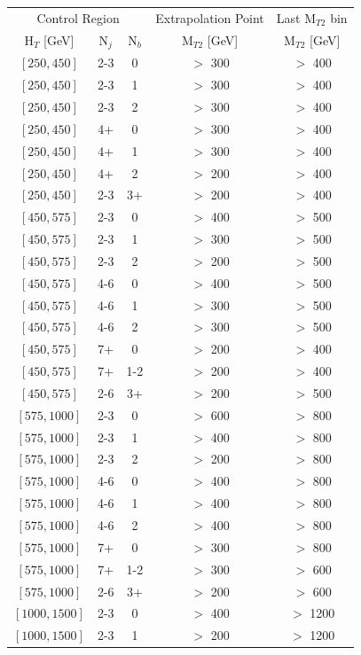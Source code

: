 \begin{table}
	\centering
	\footnotesize
	\renewcommand{\arraystretch}{0.4}
	\begin{tabular}{c|c|c|c|c}
\hline \hline
\multicolumn{3}{c|}{Control Region} & Extrapolation Point & Last $\text{M}_{T2}$ bin  \\
$\text{H}_{T}$ [GeV] & $\text{N}_{j}$ & $\text{N}_{b}$ & $\text{M}_{T2}$ [GeV] & $\text{M}_{T2}$ [GeV]\\
\hline
$[250,450]$ &2-3&0& $>$ 300& $>$ 400\\
$[250,450]$ &2-3&1& $>$ 300& $>$ 400\\
$[250,450]$ &2-3&2& $>$ 300& $>$ 400\\
$[250,450]$ &4+&0& $>$ 300& $>$ 400\\
$[250,450]$ &4+&1& $>$ 300& $>$ 400\\
$[250,450]$ &4+&2& $>$ 200& $>$ 400\\
$[250,450]$ &2-3&3+& $>$ 200& $>$ 400\\
$[450,575]$ &2-3&0& $>$ 400& $>$ 500\\
$[450,575]$ &2-3&1& $>$ 300& $>$ 500\\
$[450,575]$ &2-3&2& $>$ 200& $>$ 500\\
$[450,575]$ &4-6&0& $>$ 400& $>$ 500\\
$[450,575]$ &4-6&1& $>$ 300& $>$ 500\\
$[450,575]$ &4-6&2& $>$ 300& $>$ 500\\
$[450,575]$ &7+&0& $>$ 200& $>$ 400\\
$[450,575]$ &7+&1-2& $>$ 200& $>$ 400\\
$[450,575]$ &2-6&3+& $>$ 200& $>$ 500\\
$[575,1000]$ &2-3&0& $>$ 600& $>$ 800\\
$[575,1000]$ &2-3&1& $>$ 400& $>$ 800\\
$[575,1000]$ &2-3&2& $>$ 200& $>$ 800\\
$[575,1000]$ &4-6&0& $>$ 400& $>$ 800\\
$[575,1000]$ &4-6&1& $>$ 400& $>$ 800\\
$[575,1000]$ &4-6&2& $>$ 400& $>$ 800\\
$[575,1000]$ &7+&0& $>$ 300& $>$ 800\\
$[575,1000]$ &7+&1-2& $>$ 300& $>$ 600\\
$[575,1000]$ &2-6&3+& $>$ 200& $>$ 600\\
$[1000,1500]$ &2-3&0& $>$ 400& $>$ 1200\\
$[1000,1500]$ &2-3&1& $>$ 200& $>$ 1200\\

\end{tabular}
\end{table}
